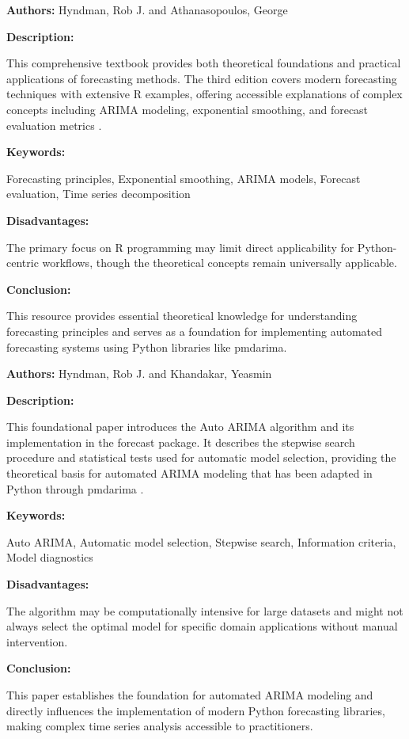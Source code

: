 
{ 
	
	\textbf{Authors:} 
	Hyndman, Rob J. and Athanasopoulos, George
	
	\textbf{Description:} 
	
	This comprehensive textbook provides both theoretical foundations and practical applications of forecasting methods. The third edition covers modern forecasting techniques with extensive R examples, offering accessible explanations of complex concepts including ARIMA modeling, exponential smoothing, and forecast evaluation metrics \autocite{HyndmanAthanasopoulos:2021}.
	
	\textbf{Keywords:} 
	
	Forecasting principles, Exponential smoothing, ARIMA models, Forecast evaluation, Time series decomposition
	
	\textbf{Disadvantages:} 
	
	The primary focus on R programming may limit direct applicability for Python-centric workflows, though the theoretical concepts remain universally applicable.
	
	\textbf{Conclusion:} 
	
	This resource provides essential theoretical knowledge for understanding forecasting principles and serves as a foundation for implementing automated forecasting systems using Python libraries like pmdarima.
	
}


{ 
	
	\textbf{Authors:} 
	Hyndman, Rob J. and Khandakar, Yeasmin
	
	\textbf{Description:} 
	
	This foundational paper introduces the Auto ARIMA algorithm and its implementation in the forecast package. It describes the stepwise search procedure and statistical tests used for automatic model selection, providing the theoretical basis for automated ARIMA modeling that has been adapted in Python through pmdarima \autocite{HyndmanKhandakar:2008}.
	
	\textbf{Keywords:} 
	
	Auto ARIMA, Automatic model selection, Stepwise search, Information criteria, Model diagnostics
	
	\textbf{Disadvantages:} 
	
	The algorithm may be computationally intensive for large datasets and might not always select the optimal model for specific domain applications without manual intervention.
	
	\textbf{Conclusion:} 
	
	This paper establishes the foundation for automated ARIMA modeling and directly influences the implementation of modern Python forecasting libraries, making complex time series analysis accessible to practitioners.
	
}

